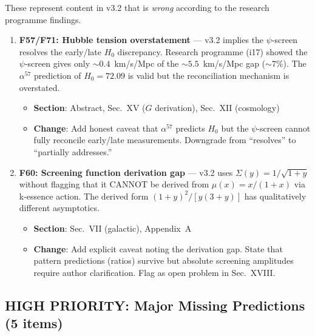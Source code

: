 \documentclass[11pt,a4paper]{article}
\begin{document}
These represent content in v3.2 that is \emph{wrong} according to the research programme findings.

\begin{enumerate}
\item \textbf{F57/F71: Hubble tension overstatement} --- v3.2 implies the $\psi$-screen resolves the early/late $H_0$ discrepancy. Research programme (i17) showed the $\psi$-screen gives only $\sim 0.4$~km/s/Mpc of the $\sim 5.5$~km/s/Mpc gap ($\sim 7\%$). The $\alpha^{57}$ prediction of $H_0 = 72.09$ is valid but the reconciliation mechanism is overstated.
\begin{itemize}
\item \textbf{Section}: Abstract, Sec.~XV ($G$ derivation), Sec.~XII (cosmology)
\item \textbf{Change}: Add honest caveat that $\alpha^{57}$ predicts $H_0$ but the $\psi$-screen cannot fully reconcile early/late measurements. Downgrade from ``resolves'' to ``partially addresses.''
\end{itemize}

\item \textbf{F60: Screening function derivation gap} --- v3.2 uses $\Sigma(y) = 1/\sqrt{1+y}$ without flagging that it CANNOT be derived from $\mu(x) = x/(1+x)$ via k-essence action. The derived form $(1+y)^2/[y(3+y)]$ has qualitatively different asymptotics.
\begin{itemize}
\item \textbf{Section}: Sec.~VII (galactic), Appendix~A
\item \textbf{Change}: Add explicit caveat noting the derivation gap. State that pattern predictions (ratios) survive but absolute screening amplitudes require author clarification. Flag as open problem in Sec.~XVIII.
\end{itemize}
\end{enumerate}

\subsection{HIGH PRIORITY: Major Missing Predictions (5 items)}
\end{document}
